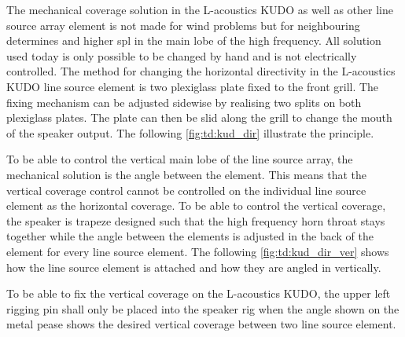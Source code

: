 


The mechanical coverage solution in the L-acoustics KUDO as well as other line source array element is not made for wind problems but for neighbouring determines and higher \gls{spl} in the main lobe of the high frequency. All solution used today is only possible to be changed by hand and is not electrically controlled. The method for changing the horizontal directivity in the L-acoustics KUDO line source element is two plexiglass plate fixed to the front grill. The fixing mechanism can be adjusted sidewise by realising two splits on both plexiglass plates. The plate can then be slid along the grill to change the mouth of the speaker output. The following \autoref{fig:td:kud_dir} illustrate the principle.


To be able to control the vertical main lobe of the line source array, the mechanical solution is the angle between the element. This means that the vertical coverage control cannot be controlled on the individual line source element as the horizontal coverage. To be able to control the vertical coverage, the speaker is trapeze designed such that the high frequency horn throat stays together while the angle between the elements is adjusted in the back of the element for every line source element. The following \autoref{fig:td:kud_dir_ver} shows how the line source element is attached and how they are angled in vertically.


To be able to fix the vertical coverage on the L-acoustics KUDO, the upper left rigging pin shall only be placed into the speaker rig when the angle shown on the metal pease shows the desired vertical coverage between two line source element.  




